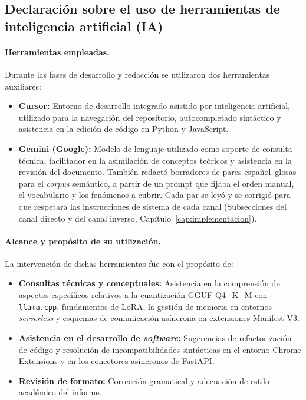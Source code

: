 \subsection{Declaración sobre el uso de herramientas de inteligencia artificial (IA)}
\paragraph{Herramientas empleadas.}
Durante las fases de desarrollo y redacción se utilizaron dos herramientas auxiliares:
\begin{itemize}
    \item \textbf{Cursor:} Entorno de desarrollo integrado asistido por inteligencia artificial, utilizado para la navegación del repositorio, autocompletado sintáctico y asistencia en la edición de código en Python y JavaScript.
    \item \textbf{Gemini (Google):} Modelo de lenguaje utilizado como soporte de consulta técnica, facilitador en la asimilación de conceptos teóricos y asistencia en la revisión del documento. También redactó borradores de pares español--glosas para el \textit{corpus} semántico, a partir de un prompt que fijaba el orden manual, el vocabulario y los fenómenos a cubrir. Cada par se leyó y se corrigió para que respetara las instrucciones de sistema de cada canal (Subsecciones del canal directo y del canal inverso, Capítulo~\ref{cap:implementacion}).
\end{itemize}

\paragraph{Alcance y propósito de su utilización.}
La intervención de dichas herramientas fue con el propósito de:
\begin{itemize}
    \item \textbf{Consultas técnicas y conceptuales:} Asistencia en la comprensión de aspectos específicos relativos a la cuantización GGUF Q4\_K\_M con \texttt{llama.cpp}, fundamentos de LoRA, la gestión de memoria en entornos \textit{serverless} y esquemas de comunicación asíncrona en extensiones Manifest V3.
    \item \textbf{Asistencia en el desarrollo de \textit{software}:} Sugerencias de refactorización de código y resolución de incompatibilidades sintácticas en el entorno Chrome Extensions y en los conectores asíncronos de FastAPI.
    \item \textbf{Revisión de formato:} Corrección gramatical y adecuación de estilo académico del informe.
\end{itemize}

